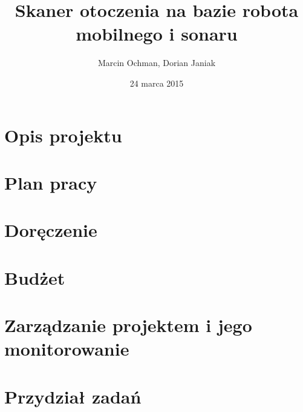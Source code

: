\documentclass[a4paper]{article}
\begin{document}
   	\title{\vspace{50mm}Skaner otoczenia na bazie robota mobilnego i sonaru}
	\author{Marcin Ochman, Dorian Janiak}
	\date{24 marca 2015}

\maketitle

\newpage

\section{Opis projektu}


\section{Plan pracy}


\section{Doręczenie}


\section{Budżet}


\section{Zarządzanie projektem i jego monitorowanie}


\section{Przydział zadań}

\end{document}

